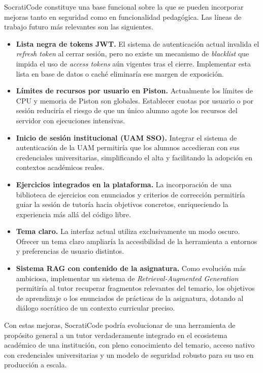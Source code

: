 SocratiCode constituye una base funcional sobre la que se pueden incorporar mejoras tanto en seguridad como en funcionalidad pedagógica. Las líneas de trabajo futuro más relevantes son las siguientes.

\begin{itemize}
    \item \textbf{Lista negra de tokens JWT.} El sistema de autenticación actual invalida el \textit{refresh token} al cerrar sesión, pero no existe un mecanismo de \textit{blacklist} que impida el uso de \textit{access tokens} aún vigentes tras el cierre. Implementar esta lista en base de datos o caché eliminaría ese margen de exposición.

    \item \textbf{Límites de recursos por usuario en Piston.} Actualmente los límites de CPU y memoria de Piston son globales. Establecer cuotas por usuario o por sesión reduciría el riesgo de que un único alumno agote los recursos del servidor con ejecuciones intensivas.

    \item \textbf{Inicio de sesión institucional (UAM SSO).} Integrar el sistema de autenticación de la UAM permitiría que los alumnos accedieran con sus credenciales universitarias, simplificando el alta y facilitando la adopción en contextos académicos reales.

    \item \textbf{Ejercicios integrados en la plataforma.} La incorporación de una biblioteca de ejercicios con enunciados y criterios de corrección permitiría guiar la sesión de tutoría hacia objetivos concretos, enriqueciendo la experiencia más allá del código libre.

    \item \textbf{Tema claro.} La interfaz actual utiliza exclusivamente un modo oscuro. Ofrecer un tema claro ampliaría la accesibilidad de la herramienta a entornos y preferencias de usuario distintos.

    \item \textbf{Sistema RAG con contenido de la asignatura.} Como evolución más ambiciosa, implementar un sistema de \textit{Retrieval-Augmented Generation} permitiría al tutor recuperar fragmentos relevantes del temario, los objetivos de aprendizaje o los enunciados de prácticas de la asignatura, dotando al diálogo socrático de un contexto curricular preciso.
\end{itemize}

Con estas mejoras, SocratiCode podría evolucionar de una herramienta de propósito general a un tutor verdaderamente integrado en el ecosistema académico de una institución, con pleno conocimiento del temario, acceso nativo con credenciales universitarias y un modelo de seguridad robusto para su uso en producción a escala.

